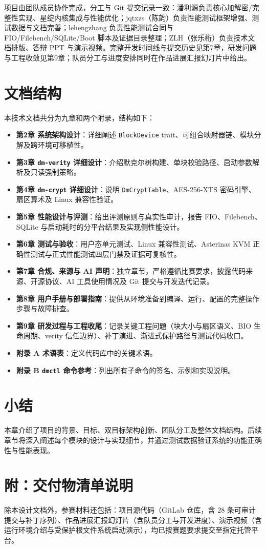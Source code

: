 项目由团队成员协作完成，分工与 Git 提交记录一致：潘利源负责核心加解密/完整性实现、星绽内核集成与性能优化；jqtxzs（陈韵）负责性能测试框架增强、测试数据与文档完善；lehengzhang 负责性能测试合同与 FIO/Filebench/SQLite/Boot 脚本及证据目录整理；ZLH（张乐桁）负责技术文档排版、答辩 PPT 与演示视频。完整开发时间线与提交历史见第7章，研发问题与工程收敛见第9章；队员分工与进度安排同时在作品进展汇报幻灯片中给出。

\section{文档结构}

本技术文档共分为九章和两个附录，结构如下：

\begin{itemize}
    \item \textbf{第2章 系统架构设计}：详细阐述 \texttt{BlockDevice} trait、可组合映射器链、模块分解及跨环境可移植性。
    \item \textbf{第3章 \texttt{dm-verity} 详细设计}：介绍默克尔树构建、单块校验路径、启动参数解析及只读强制策略。
    \item \textbf{第4章 \texttt{dm-crypt} 详细设计}：说明 \texttt{DmCryptTable}、AES-256-XTS 密码引擎、扇区算术及 Linux 兼容性验证。
    \item \textbf{第5章 性能设计与评测}：给出评测原则与真实性审计，报告 FIO、Filebench、SQLite 与启动耗时的分平台结果及实现侧性能设计。
    \item \textbf{第6章 测试与验收}：用户态单元测试、Linux 兼容性测试、Asterinas KVM 正确性测试与正式性能测试四层门禁及证据可复核性。
    \item \textbf{第7章 合规、来源与 AI 声明}：独立章节，严格遵循比赛要求，披露代码来源、开源协议、AI 工具使用情况及 Git 提交与开发迭代记录。
    \item \textbf{第8章 用户手册与部署指南}：提供从环境准备到编译、运行、配置的完整操作步骤与故障排查。
    \item \textbf{第9章 研发过程与工程收尾}：记录关键工程问题（块大小与扇区语义、BIO 生命周期、verity 信任边界）、补丁演进、渐进式保护路径与测试代码收口。
    \item \textbf{附录 A 术语表}：定义代码库中的关键术语。
    \item \textbf{附录 B \texttt{dmctl} 命令参考}：列出所有子命令的签名、示例和实现说明。
\end{itemize}

\section{小结}

本章介绍了项目的背景、目标、双目标架构创新、团队分工及整体文档结构。后续章节将深入阐述每个模块的设计与实现细节，并通过测试数据验证系统的功能正确性与性能表现。

\section*{附：交付物清单说明}

除本设计文档外，参赛材料还包括：项目源代码（GitLab 仓库，含 28 条可审计提交与补丁序列）、作品进展汇报幻灯片（含队员分工与开发进度）、演示视频（含运行环境介绍与受保护根文件系统启动演示），均已按赛题要求提交至指定托管平台。